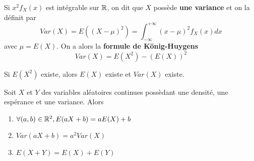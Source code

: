 \documentclass[a4paper, 12pt]{article}
\begin{document}
\begin{definition}
    Si $x^2 f_X(x)$ est intégrable sur $\mathbb{R}$, on dit que $X$ possède \textbf{une variance} et on la définit par
    $$
    Var(X) = E((X - \mu)^2) = \int_{-\infty}^{+\infty} (x - \mu)^2 f_X(x) dx
    $$
    avec $\mu = E(X)$.
    On a alors la \textbf{formule de König-Huygens}
    $$
    Var(X) = E(X^2) - (E(X))^2
    $$
\end{definition}

\begin{remarque}
    Si $E(X^2)$ existe, alors $E(X)$ existe et $Var(X)$ existe.
\end{remarque}

\begin{theoreme}{}{}
    Soit $X$ et $Y$ des variables aléatoires continues possèdant une densité, une espérance et une variance. Alors
    \begin{enumerate}
        \item $\forall (a, b) \in \mathbb{R}^2, E(aX + b) = aE(X) + b$
        \item $Var(aX + b) = a^2 Var(X)$
        \item $E(X + Y) = E(X) + E(Y)$
    \end{enumerate}
\end{theoreme}
\end{document}
